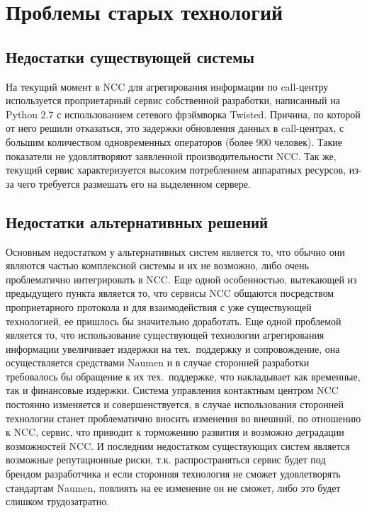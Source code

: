 \section{Проблемы старых технологий}

\subsection{Недостатки существующей системы}

На текущий момент в NCC для агрегирования информации по call-центру используется проприетарный сервис
собственной разработки, написанный на Python 2.7 с использованием сетевого фрэймворка Twisted.
Причина, по которой от него решили отказаться, это задержки обновления данных в call-центрах,
с большим количеством одновременных операторов (более 900 человек).
Такие показатели не удовлятворяют заявленной производительности NCC. %
Так же, текущий сервис характеризуется высоким потреблением аппаратных ресурсов,
из-за чего требуется размешать его на выделенном сервере.

\subsection{Недостатки альтернативных решений}

Основным недостатком у альтернативных систем является то,
что обычно они являются частью комплексной системы и их не возможно,
либо очень проблематично интегрировать в NCC\@.
Еще одной особенностью, вытекающей из предыдущего пункта является то,
что сервисы NCC общаются посредством проприетарного протокола и для взаимодействия
с уже существующей технологией, ее пришлось бы значительно доработать.
Еще одной проблемой является то, что использование существующей технологии агрегирования информации
увеличивает издержки на тех.~поддержку и сопровождение,
она осуществляется средствами Naumen и в случае сторонней разработки требовалось бы обращение
к их тех.~поддержке, что накладывает как временные, так и финансовые издержки.
Система управления контактным центром NCC постоянно изменяется и совершенствуется,
в случае использования сторонней технологии станет проблематично вносить изменения во внешний,
по отношению к NCC, сервис, что приводит к торможению развития и возможно деградации возможностей NCC.
И последним недостатком существующих систем является возможные репутационные риски,
т.к. распространяться сервис будет под брендом разработчика
и если сторонняя технология не сможет удовлетворять стандартам Naumen,
повлиять на ее изменение он не сможет, либо это будет слишком трудозатратно.

